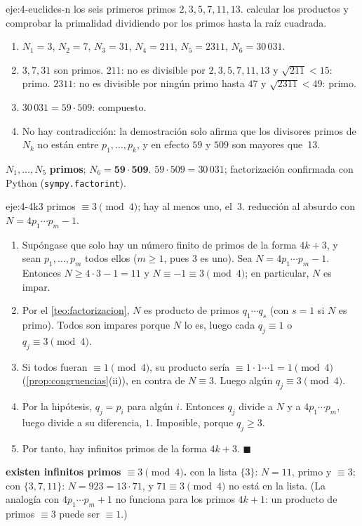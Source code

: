 \begin{solucion}{eje:4-euclides-n}
\datos los seis primeros primos $2,3,5,7,11,13$.
\planteamiento calcular los productos y comprobar la primalidad dividiendo por los primos hasta la raíz cuadrada.
\pasos
\begin{enumerate}[label=\arabic*.]
  \item $N_1=3$, $N_2=7$, $N_3=31$, $N_4=211$, $N_5=2311$, $N_6=30\,031$.
  \item $3,7,31$ son primos. $211$: no es divisible por $2,3,5,7,11,13$ y $\sqrt{211}<15$: primo. $2311$: no es divisible por ningún primo hasta $47$ y $\sqrt{2311}<49$: primo.
  \item $30\,031=59\cdot 509$: compuesto.
  \item No hay contradicción: la demostración solo afirma que los divisores primos de $N_k$ no están entre $p_1,\dots,p_k$, y en efecto $59$ y $509$ son mayores que~13.
\end{enumerate}
\resultado $N_1,\dots,N_5$ \textbf{primos}; $N_6=\mathbf{59\cdot 509}$.
\comprobacion $59\cdot 509=30\,031$; factorización confirmada con Python (\texttt{sympy.factorint}).
\end{solucion}

\begin{solucion}{eje:4-4k3}
\datos primos $\equiv 3\pmod 4$; hay al menos uno, el~3.
\planteamiento reducción al absurdo con $N=4p_1\cdots p_m-1$.
\pasos
\begin{enumerate}[label=\arabic*.]
  \item Supóngase que solo hay un número finito de primos de la forma $4k+3$, y sean $p_1,\dots,p_m$ todos ellos ($m\ge 1$, pues $3$ es uno). Sea $N=4p_1\cdots p_m-1$. Entonces $N\ge 4\cdot 3-1=11$ y $N\equiv -1\equiv 3\pmod 4$; en particular, $N$ es impar.
  \item Por el \cref{teo:factorizacion}, $N$ es producto de primos $q_1\cdots q_s$ (con $s=1$ si $N$ es primo). Todos son impares porque $N$ lo es, luego cada $q_j\equiv 1$ o $q_j\equiv 3\pmod 4$.
  \item Si todos fueran $\equiv 1\pmod 4$, su producto sería $\equiv 1\cdot1\cdots1=1\pmod 4$ (\cref{prop:congruencias}(ii)), en contra de $N\equiv 3$. Luego algún $q_j\equiv 3\pmod 4$.
  \item Por la hipótesis, $q_j=p_i$ para algún $i$. Entonces $q_j$ divide a $N$ y a $4p_1\cdots p_m$, luego divide a su diferencia, $1$. Imposible, porque $q_j\ge 3$.
  \item Por tanto, hay infinitos primos de la forma $4k+3$. $\blacksquare$
\end{enumerate}
\resultado \textbf{existen infinitos primos $\equiv 3\pmod 4$.}
\comprobacion con la lista $\{3\}$: $N=11$, primo y $\equiv 3$; con $\{3,7,11\}$: $N=923=13\cdot 71$, y $71\equiv 3\pmod 4$ no está en la lista. (La analogía con $4p_1\cdots p_m+1$ no funciona para los primos $4k+1$: un producto de primos $\equiv 3$ puede ser $\equiv 1$.)
\end{solucion}


